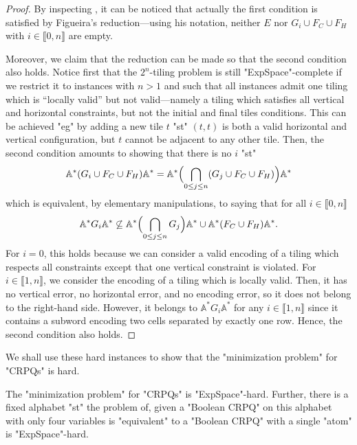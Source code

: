\begin{proof}

	By inspecting \cite[Proof of Lemma 8, pp. 15--17]{Figueira2020Containment},
	it can be noticed that
	actually the first condition is satisfied by Figueira's reduction---using his notation,
	neither $E$ nor $G_i\cup F_C\cup F_H$ with $i \in \lBrack 0,n\rBrack$
	are empty.
	
	Moreover, we claim that the reduction can be made so that the second condition also holds.
	Notice first that the $2^n$-tiling problem is still "ExpSpace"-complete
	if we restrict it to instances with $n > 1$ and such that all instances admit one tiling which is
	``locally valid'' but not valid---namely a tiling which satisfies all vertical and horizontal constraints,
	but not the initial and final tiles conditions.
	This can be achieved "eg" by
	adding a new tile $t$ "st" $(t,t)$ is both a valid horizontal and vertical configuration,
	but $t$ cannot be adjacent to any other tile.
	Then, the second condition amounts to showing that there is no $i$ "st"
	\[
		\mathbb{A}^* (G_i \cup F_C \cup F_H) \mathbb{A}^* =
		\mathbb{A}^* \Bigl( \bigcap_{0 \leq j \leq n} (G_j \cup F_C \cup F_H)\Bigr) \mathbb{A}^*
		\]
		which is equivalent, by elementary manipulations, to saying that for all $i \in \lBrack 0,n\rBrack$
		\[
			\mathbb{A}^* G_i \mathbb{A}^*
			\not\subseteq 
			\mathbb{A}^* \Bigl( \bigcap_{0 \leq j \leq n} G_j \Bigr) \mathbb{A}^*
			\cup \mathbb{A}^* (F_C \cup F_H) \mathbb{A}^*.
			\]
			For $i=0$, this holds because we can consider a valid encoding of a tiling
			which respects all constraints except that one vertical constraint is violated.
			For $i \in \lBrack 1,n\rBrack$, we consider the encoding of a tiling which is locally valid.
			Then, it has no vertical error, no horizontal error, and no encoding error, so
			it does not belong to the right-hand side.
			However, it belongs to $\mathbb{A}^* G_i \mathbb{A}^*$ for any $i \in \lBrack 1,n\rBrack$ since it contains a subword encoding two cells separated by exactly one row. Hence,
			the second condition also holds.
\end{proof}

We shall use these hard instances to show that the "minimization problem" for "CRPQs" is hard.
\begin{theorem}
	\AP\label{thm:minimization-lowerbound}
	The "minimization problem" for "CRPQs" is "ExpSpace"-hard. Further, there is a fixed alphabet "st" the problem of, given a "Boolean CRPQ"
	on this alphabet with only four variables is "equivalent"
	to a "Boolean CRPQ" with a single "atom" is "ExpSpace"-hard.
\end{theorem}

